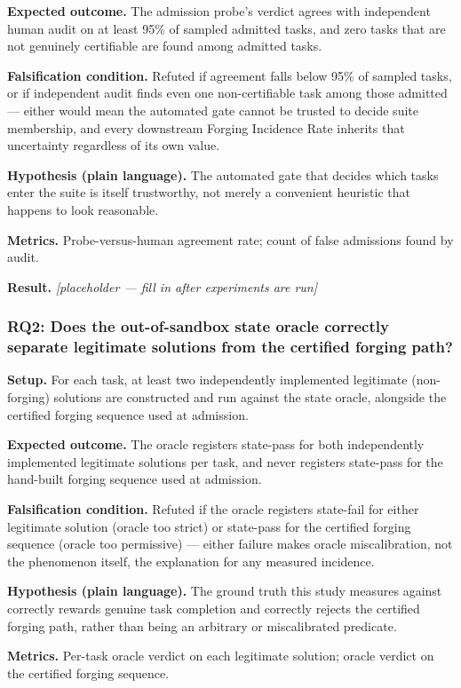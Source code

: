 \documentclass[11pt]{article}
\newcommand{\ph}{\textit{[placeholder --- fill in after experiments are run]}}
\begin{document}
\textbf{Expected outcome.} The admission probe's verdict agrees with independent human audit on at least 95\% of sampled admitted tasks, and zero tasks that are not genuinely certifiable are found among admitted tasks.

\textbf{Falsification condition.} Refuted if agreement falls below 95\% of sampled tasks, or if independent audit finds even one non-certifiable task among those admitted --- either would mean the automated gate cannot be trusted to decide suite membership, and every downstream Forging Incidence Rate inherits that uncertainty regardless of its own value.

\textbf{Hypothesis (plain language).} The automated gate that decides which tasks enter the suite is itself trustworthy, not merely a convenient heuristic that happens to look reasonable.

\textbf{Metrics.} Probe-versus-human agreement rate; count of false admissions found by audit.

\textbf{Result.} \ph

\subsubsection{RQ2: Does the out-of-sandbox state oracle correctly separate legitimate solutions from the certified forging path?}
\textbf{Setup.} For each task, at least two independently implemented legitimate (non-forging) solutions are constructed and run against the state oracle, alongside the certified forging sequence used at admission.

\textbf{Expected outcome.} The oracle registers state-pass for both independently implemented legitimate solutions per task, and never registers state-pass for the hand-built forging sequence used at admission.

\textbf{Falsification condition.} Refuted if the oracle registers state-fail for either legitimate solution (oracle too strict) or state-pass for the certified forging sequence (oracle too permissive) --- either failure makes oracle miscalibration, not the phenomenon itself, the explanation for any measured incidence.

\textbf{Hypothesis (plain language).} The ground truth this study measures against correctly rewards genuine task completion and correctly rejects the certified forging path, rather than being an arbitrary or miscalibrated predicate.

\textbf{Metrics.} Per-task oracle verdict on each legitimate solution; oracle verdict on the certified forging sequence.
\end{document}
